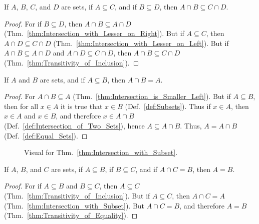         \begin{theorem}
            \label{thm:A_cap_B_Subset_C_cap_D}%
            If $A$, $B$, $C$, and $D$ are sets, if $A\subseteq{C}$, and if
            $B\subseteq{D}$, then $A\cap{B}\subseteq{C}\cap{D}$.
        \end{theorem}
        \begin{proof}
            For if $B\subseteq{D}$, then $A\cap{B}\subseteq{A}\cap{D}$
            (Thm.~\ref{thm:Intersection_with_Lesser_on_Right}). But if
            $A\subseteq{C}$, then $A\cap{D}\subseteq{C}\cap{D}$
            (Thm.~\ref{thm:Intersection_with_Lesser_on_Left}). But if
            $A\cap{B}\subseteq{A}\cap{D}$ and $A\cap{D}\subseteq{C}\cap{D}$,
            then $A\cap{B}\subseteq{C}\cap{D}$
            (Thm.~\ref{thm:Transitivity_of_Inclusion}).
        \end{proof}
        \begin{theorem}
            \label{thm:Intersection_with_Subset}%
            If $A$ and $B$ are sets, and if $A\subseteq{B}$, then $A\cap{B}=A$.
        \end{theorem}
        \begin{proof}
            For $A\cap{B}\subseteq{A}$
            (Thm.~\ref{thm:Intersection_is_Smaller_Left}). But if
            $A\subseteq{B}$, then for all $x\in{A}$ it is true that $x\in{B}$
            (Def.~\ref{def:Subsets}). Thus if $x\in{A}$, then $x\in{A}$ and
            $x\in{B}$, and therefore $x\in{A}\cap{B}$
            (Def.~\ref{def:Intersection_of_Two_Sets}), hence
            $A\subseteq{A}\cap{B}$. Thus, $A=A\cap{B}$
            (Def.~\ref{def:Equal_Sets}).
        \end{proof}
        \begin{figure}[H]
            \centering
            \captionsetup{type=figure}
            \centering
            
            \caption{Visual for Thm.~\ref{thm:Intersection_with_Subset}.}
            \label{fig:Intersection_with_Subset}
        \end{figure}
        \begin{theorem}
            \label{thm:A_sub_B_sub_C_and_A_cap_C_eq_B}%
            If $A$, $B$, and $C$ are sets, if $A\subseteq{B}$, if
            $B\subseteq{C}$, and if $A\cap{C}=B$, then $A=B$.
        \end{theorem}
        \begin{proof}
            For if $A\subseteq{B}$ and $B\subseteq{C}$, then $A\subseteq{C}$
            (Thm.~\ref{thm:Transitivity_of_Inclusion}). But if $A\subseteq{C}$,
            then $A\cap{C}=A$ (Thm.~\ref{thm:Intersection_with_Subset}). But
            $A\cap{C}=B$, and therefore $A=B$
            (Thm.~\ref{thm:Transitivity_of_Equality}).
        \end{proof}
